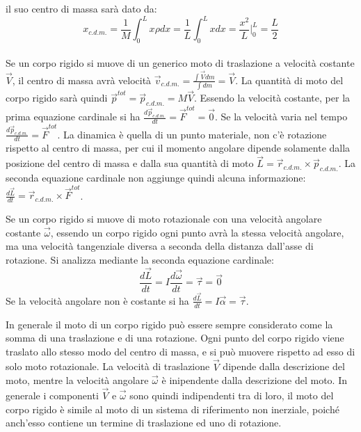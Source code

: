 \documentclass{article}
\numberwithin{equation}{subsection}
\begin{document}
il suo centro di massa sarà dato da:
\begin{equation*}
    x_{c.d.m.}=\displaystyle\frac{1}{M}\int_{0}^{L}x\rho dx=\frac{1}{L}\int_{0}^{L}xdx=\frac{x^2}{L}\Bigg|_0^L=\frac{L}{2} 
\end{equation*}
\\
Se un corpo rigido si muove di un generico moto di traslazione a velocità costante $\vec{V}$, 
il centro di massa avrà velocità $\vec{v}_{c.d.m.}=\displaystyle\frac{\int\vec{V}dm}{\int dm}=\vec{V}$. La quantità di moto del corpo rigido sarà quindi 
$\vec{p}^{tot}=\vec{p}_{c.d.m.}=M\vec{V}$. Essendo la velocità costante, per la prima equazione cardinale si ha $\displaystyle\frac{d\vec{p}_{c.d.m.}}{dt}=\vec{F}^{tot}=\vec0$. 
Se la velocità varia nel tempo $\displaystyle\frac{d\vec{p}_{c.d.m.}}{dt}=\vec{F}^{tot}$. 
La dinamica è quella di un punto materiale, non c'è rotazione rispetto al centro di massa, per cui il 
momento angolare dipende solamente dalla posizione del centro di massa e dalla sua quantità di moto $\vec L=\vec{r}_{c.d.m.}\times\vec{p}_{c.d.m.}$. La seconda 
equazione cardinale non aggiunge quindi alcuna informazione: $\displaystyle\frac{d\vec{L}}{dt}=\vec{r}_{c.d.m.}\times\vec{F}^{tot}$. 



Se un corpo rigido si muove di moto rotazionale con una velocità 
angolare costante $\vec{\omega}$, essendo un corpo rigido ogni punto avrà la stessa velocità angolare, ma una velocità tangenziale diversa a seconda della distanza 
dall'asse di rotazione. Si analizza mediante la seconda equazione cardinale:
\begin{equation}
    \displaystyle\frac{d\vec{L}}{dt}=I\frac{d\vec\omega}{dt}=\vec{\tau}=\vec0
\end{equation}
Se la velocità angolare non è costante si ha $\displaystyle\frac{d\vec{L}}{dt}=I\vec{\alpha}=\vec{\tau}$. 



In generale il moto di un corpo rigido può essere sempre considerato come la somma di una traslazione e di una rotazione. Ogni punto del corpo rigido viene traslato 
allo stesso modo del centro di massa, e si può muovere rispetto ad esso di solo moto rotazionale. La velocità di traslazione $\vec{V}$ dipende dalla descrizione del moto, 
mentre la velocità angolare $\vec{\omega}$ è inipendente dalla descrizione del moto. In generale i componenti $\vec{V}$ e $\vec{\omega}$ sono quindi indipendenti tra di loro, 
il moto del corpo rigido è simile al moto di un sistema di riferimento non inerziale, poiché anch'esso contiene un termine di traslazione ed uno di rotazione. 
\end{document}
